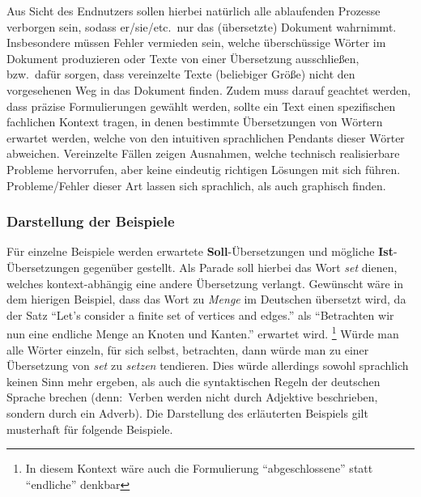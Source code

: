 Aus Sicht des Endnutzers sollen hierbei natürlich alle ablaufenden Prozesse verborgen sein, sodass er/sie/etc.\ nur das (übersetzte) Dokument wahrnimmt. Insbesondere müssen Fehler vermieden sein, welche überschüssige Wörter im Dokument produzieren oder Texte von einer Übersetzung ausschließen, bzw.\ dafür sorgen, dass vereinzelte Texte (beliebiger Größe) nicht den vorgesehenen Weg in das Dokument finden. Zudem muss darauf geachtet werden, dass präzise Formulierungen gewählt werden, sollte ein Text einen spezifischen fachlichen Kontext tragen, in denen bestimmte Übersetzungen von Wörtern erwartet werden, welche von den intuitiven sprachlichen Pendants dieser Wörter abweichen.
Vereinzelte Fällen zeigen Ausnahmen, welche technisch realisierbare Probleme hervorrufen, aber keine eindeutig richtigen Lösungen mit sich führen. Probleme/Fehler dieser Art lassen sich sprachlich, als auch graphisch finden.

\newpage

\subsubsection{Darstellung der Beispiele}
Für einzelne Beispiele werden erwartete \textbf{Soll}-Übersetzungen und mögliche \textbf{Ist}-Übersetzungen gegenüber gestellt. Als Parade soll hierbei das Wort \textit{set} dienen, welches kontext-abhängig eine andere Übersetzung verlangt. Gewünscht wäre in dem hierigen Beispiel, dass das Wort zu \textit{Menge} im Deutschen übersetzt wird, da der Satz \enquote{Let's consider a finite set of vertices and edges.} als \enquote{Betrachten wir nun eine endliche Menge an Knoten und Kanten.} erwartet wird.
\footnote{In diesem Kontext wäre auch die Formulierung \enquote{abgeschlossene} statt \enquote{endliche} denkbar}
Würde man alle Wörter einzeln, für sich selbst, betrachten, dann würde man zu einer Übersetzung von \textit{set} zu \textit{setzen} tendieren. Dies würde allerdings sowohl sprachlich keinen Sinn mehr ergeben, als auch die syntaktischen Regeln der deutschen Sprache brechen (denn:\ Verben werden nicht durch Adjektive beschrieben, sondern durch ein Adverb).
Die Darstellung des erläuterten Beispiels gilt musterhaft für folgende Beispiele.



